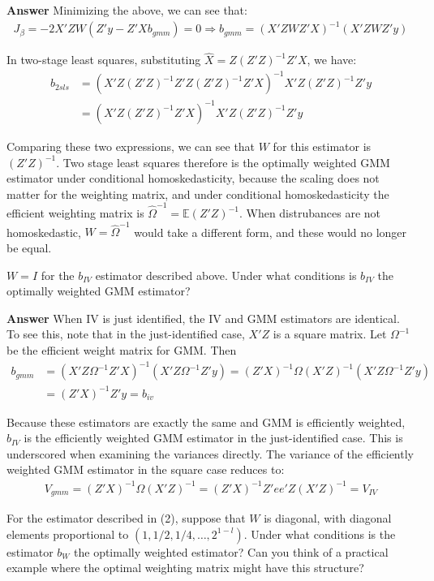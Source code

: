 \documentclass[11pt]{exam}
\begin{document}
\begin{questions}
\textbf{Answer} Minimizing the above, we can see that:
\begin{align*}
J_\beta = -2X'ZW(Z'y - Z'Xb_{gmm}) = 0 \Rightarrow b_{gmm} = (X'ZWZ'X)^{-1}(X'ZWZ'y)
\end{align*}

In two-stage least squares, substituting $\hat{X} = Z(Z'Z)^{-1}Z'X$, we have:
\begin{align*}
b_{2sls} &= (X'Z(Z'Z)^{-1}Z'Z(Z'Z)^{-1}Z'X)^{-1}X'Z(Z'Z)^{-1}Z'y \\
&= (X'Z(Z'Z)^{-1}Z'X)^{-1}X'Z(Z'Z)^{-1}Z'y
\end{align*}

Comparing these two expressions, we can see that $W$ for this estimator is $(Z'Z)^{-1}$. Two stage least squares therefore is the optimally weighted GMM estimator under conditional homoskedasticity, because the scaling does not matter for the weighting matrix, and under conditional homoskedasticity the efficient weighting matrix is $\hat{\Omega}^{-1} = \mathbb{E}(Z'Z)^{-1}$. When distrubances are not homoskedastic, $W = \hat{\Omega}^{-1}$ would take a different form, and these would no longer be equal. 

\question $W = I$ for the $b_{IV}$ estimator described above. Under what conditions is $b_{IV}$ the optimally weighted GMM estimator?

\textbf{Answer} When IV is just identified, the IV and GMM estimators are identical. To see this, note that in the just-identified case, $X'Z$ is a square matrix. Let $\Omega^{-1}$ be the efficient weight matrix for GMM. Then
\begin{align*}
b_{gmm} &= (X'Z\Omega^{-1}Z'X)^{-1}(X'Z\Omega^{-1}Z'y) = (Z'X)^{-1}\Omega(X'Z)^{-1}(X'Z\Omega^{-1}Z'y) \\
 &= (Z'X)^{-1}Z'y = b_{iv}
\end{align*}

Because these estimators are exactly the same and GMM is efficiently weighted, $b_{IV}$ is the efficiently weighted GMM estimator in the just-identified case. This is underscored when examining the variances directly. The variance of the efficiently weighted GMM estimator in the square case reduces to:
\begin{align*}
V_{gmm} = (Z'X)^{-1}\Omega (X'Z)^{-1} = (Z'X)^{-1}Z'ee'Z(X'Z)^{-1} = V_{IV}
\end{align*}


\question For the estimator described in (2), suppose that $W$ is diagonal, with diagonal elements proportional to $(1,1/2,1/4,\ldots,2^{1-l})$. Under what conditions is the estimator $b_W$ the optimally weighted estimator? Can you think of a practical example where the optimal weighting matrix might have this structure?


\end{questions}
\end{document}
